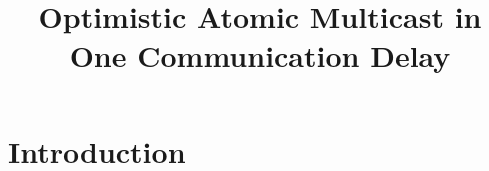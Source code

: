 \documentclass[times, 10pt]{article}
\begin{document}
\newcommand{\mv}[1]{\ensuremath{\operatorname{\mathit{#1}}}}
\newcommand{\bc}[1]{\textcolor{dark}{#1}}
\newtheorem{lems}{Lemma}
\newtheorem{props}{Proposition}
\newtheorem{thms}{Theorem}
\newtheorem{defs}{Definition}
\newtheorem{obs}{Observation}

\newcommand{\code}[1]{\texttt{\small{\textbf{#1}}}}

\newcommand{\blankline}{\vspace{4 mm}}
\newcommand{\amcast}{\mbox{multicast}}
\newcommand{\amdel}{\mbox{deliver}}
\newcommand{\amdelarg}[1]{\mbox{\amdel({#1})}}
\newcommand{\amcastarg}[1]{\mbox{\amcast({#1})}}
\newcommand{\tconsm}{T_{cons}}
\newcommand{\tcons}{\mbox{$\tconsm$}}
\newcommand{\optdel}{\mbox{opt-deliver}}
\newcommand{\consdel}{\amdel}
\newcommand{\rmcast}{\mbox{fr-mcast}}
\newcommand{\rmdel}{\mbox{fr-deliver}}
\newcommand{\optdelarg}[1]{\mbox{\opt({#1})}}
\newcommand{\consdelarg}[1]{\amdelarg{#1}}
\newcommand{\rmcastarg}[2]{\mbox{\rmcast({#1},{#2})}}
\newcommand{\rmdelarg}[1]{\mbox{\rmdel({#1})}}

\newcommand{\localmsgs}{messages\text{$_g$}}
\newcommand{\decided}{decided\text{$_g$}}
\newcommand{\stamped}{stamped}
\newcommand{\delivered}{delivered}%


\title{Optimistic Atomic Multicast in One Communication Delay}


\maketitle

\begin{abstract}

\end{abstract}

\section{Introduction}
\label{sec:intro}
\end{document}
